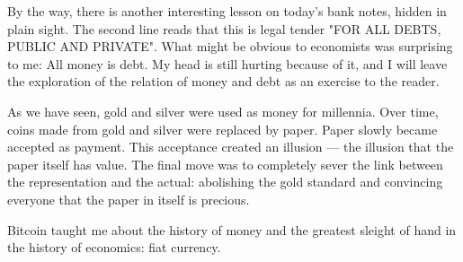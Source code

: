 By the way, there is another interesting lesson on today's bank notes,
hidden in plain sight. The second line reads that this is legal tender
"FOR ALL DEBTS, PUBLIC AND PRIVATE". What might be obvious to economists
was surprising to me: All money is debt. My head is still hurting
because of it, and I will leave the exploration of the relation of money
and debt as an exercise to the reader.

As we have seen, gold and silver were used as money for millennia. Over
time, coins made from gold and silver were replaced by paper. Paper
slowly became accepted as payment. This acceptance created an
illusion --- the illusion that the paper itself has value. The final
move was to completely sever the link between the representation and the
actual: abolishing the gold standard and convincing everyone that the
paper in itself is precious.

Bitcoin taught me about the history of money and the greatest sleight of
hand in the history of economics: fiat currency.

%
%
%
%
